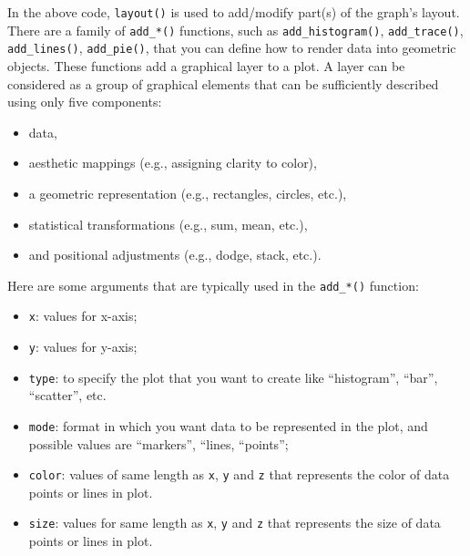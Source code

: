 \documentclass[]{book}
\newenvironment{Shaded}{\begin{snugshade}}{\end{snugshade}}
\newcommand{\KeywordTok}[1]{\textcolor[rgb]{0.13,0.29,0.53}{\textbf{#1}}}
\newcommand{\DataTypeTok}[1]{\textcolor[rgb]{0.13,0.29,0.53}{#1}}
\newcommand{\StringTok}[1]{\textcolor[rgb]{0.31,0.60,0.02}{#1}}
\newcommand{\OperatorTok}[1]{\textcolor[rgb]{0.81,0.36,0.00}{\textbf{#1}}}
\newcommand{\NormalTok}[1]{#1}
\providecommand{\tightlist}{%
  \setlength{\itemsep}{0pt}\setlength{\parskip}{0pt}}
\begin{document}
\begin{Shaded}
\end{Shaded}

In the above code, \texttt{layout()} is used to add/modify part(s) of
the graph's layout. There are a family of \texttt{add\_*()} functions,
such as \texttt{add\_histogram()}, \texttt{add\_trace()},
\texttt{add\_lines()}, \texttt{add\_pie()}, that you can define how to
render data into geometric objects. These functions add a graphical
layer to a plot. A layer can be considered as a group of graphical
elements that can be sufficiently described using only five components:

\begin{itemize}
\tightlist
\item
  data,
\item
  aesthetic mappings (e.g., assigning clarity to color),
\item
  a geometric representation (e.g., rectangles, circles, etc.),
\item
  statistical transformations (e.g., sum, mean, etc.),
\item
  and positional adjustments (e.g., dodge, stack, etc.).
\end{itemize}

Here are some arguments that are typically used in the \texttt{add\_*()}
function:

\begin{itemize}
\tightlist
\item
  \texttt{x}: values for x-axis;
\item
  \texttt{y}: values for y-axis;
\item
  \texttt{type}: to specify the plot that you want to create like
  ``histogram'', ``bar'', ``scatter'', etc.
\item
  \texttt{mode}: format in which you want data to be represented in the
  plot, and possible values are ``markers'', ``lines, ``points'';
\item
  \texttt{color}: values of same length as \texttt{x}, \texttt{y} and
  \texttt{z} that represents the color of data points or lines in plot.
\item
  \texttt{size}: values for same length as \texttt{x}, \texttt{y} and
  \texttt{z} that represents the size of data points or lines in plot.
\end{itemize}
\end{document}
